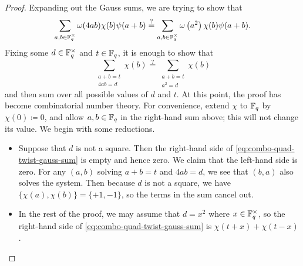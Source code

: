 \begin{proof}
    Expanding out the Gauss sums, we are trying to show that
    \[\sum_{a,b\in\mathbb F_q^\times}\omega(4ab)\chi(b)\psi(a+b)\stackrel?=\sum_{a,b\in\mathbb F_q^\times}\omega\left(a^2\right)\chi(b)\psi(a+b).\]
    Fixing some $d\in\mathbb F_q^\times$ and $t\in\mathbb F_q$, it is enough to show that
    \begin{equation}
        \sum_{\substack{a+b=t\\4ab=d}}\chi(b) \stackrel?= \sum_{\substack{a+b=t\\a^2=d}}\chi(b) \label{eq:combo-quad-twist-gauss-sum}
    \end{equation}
    and then sum over all possible values of $d$ and $t$. At this point, the proof has become combinatorial number theory. For convenience, extend $\chi$ to $\mathbb F_q$ by $\chi(0)\coloneqq0$, and allow $a,b\in\mathbb F_q$ in the right-hand sum above; this will not change its value. We begin with some reductions.
    \begin{itemize}
        \item Suppose that $d$ is not a square. Then the right-hand side of \eqref{eq:combo-quad-twist-gauss-sum} is empty and hence zero. We claim that the left-hand side is zero. For any $(a,b)$ solving $a+b=t$ and $4ab=d$, we see that $(b,a)$ also solves the system. Then because $d$ is not a square, we have $\{\chi(a),\chi(b)\}=\{+1,-1\}$, so the terms in the sum cancel out.
        \item In the rest of the proof, we may assume that $d=x^2$ where $x\in\mathbb F_q^\times$, so the right-hand side of \eqref{eq:combo-quad-twist-gauss-sum} is $\chi(t+x)+\chi(t-x)$.
        

\end{itemize}
\end{proof}
